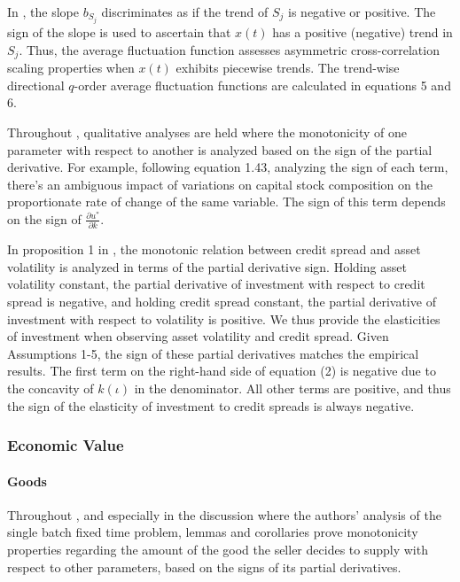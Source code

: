 \documentclass[11pt]{book}
\begin{document}
In \cite{shahzad2020clean}, the slope $b_{S_{j}}$ discriminates
as if the trend of $S_{j}$ is negative or positive. The sign of the
slope is used to ascertain that $x\left(t\right)$ has a positive
(negative) trend in $S_{j}$. Thus, the average fluctuation function
assesses asymmetric cross-correlation scaling properties when $x\left(t\right)$
exhibits piecewise trends. The trend-wise directional $q$-order average
fluctuation functions are calculated in equations 5 and 6.

Throughout \cite{cicerothree}, qualitative analyses are held where
the monotonicity of one parameter with respect to another is analyzed
based on the sign of the partial derivative. For example, following
equation 1.43, analyzing the sign of each term, there's an ambiguous
impact of variations on capital stock composition on the proportionate
rate of change of the same variable. The sign of this term depends
on the sign of $\frac{\partial u^{*}}{\partial k}$.

In proposition 1 in \cite{chang2021bonds}, the monotonic relation
between credit spread and asset volatility is analyzed in terms of
the partial derivative sign. Holding asset volatility constant, the
partial derivative of investment with respect to credit spread is
negative, and holding credit spread constant, the partial derivative
of investment with respect to volatility is positive. We thus provide
the elasticities of investment when observing asset volatility and
credit spread. Given Assumptions 1-5, the sign of these partial derivatives
matches the empirical results. The first term on the right-hand side
of equation (2) is negative due to the concavity of $k\left(\iota\right)$
in the denominator. All other terms are positive, and thus the sign
of the elasticity of investment to credit spreads is always negative.


\subsubsection{Economic Value}

\paragraph{Goods}

Throughout \cite{van2017economic}, and especially in the discussion
where the authors' analysis of the single batch fixed time problem,
lemmas and corollaries prove monotonicity properties regarding the
amount of the good the seller decides to supply with respect to other
parameters, based on the signs of its partial derivatives.
\end{document}
